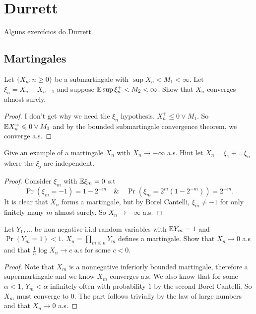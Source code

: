 \section{Durrett}
Alguns exercícios do Durrett.
\subsection{Martingales}
\begin{exercise} [4.2.4]
	Let $\{X_n : n \geq 0\}$ be a submartingale with $\sup X_n < M_1 < \infty$.
	Let $\xi_n = X_{n} - X_{n-1}$ and suppose $\mathbb{E} \sup \xi_n^+ < M_2 < \infty$.
	Show that $X_n$ converges almost surely.
\end{exercise}

\begin{proof}
	I don't get why we need the $\xi_n$ hypothesis.
	$X_n^+ \leq 0 \lor M_1$. So $\mathbb{E} X_n^+ \leqslant 0 \lor M_1$
	and by the bounded submartingale convergence theorem,
	we converge a.s.
\end{proof}

\begin{exercise}[4.2.5]
	Give an example of a martingale $X_n$ with $X_n \to -\infty$ a.s.
	Hint let $X_n = \xi_1 + \dots \xi_n$ where the $\xi_j$ are independent.
\end{exercise}
\begin{proof}
	Consider $\xi_m$ with $\mathbb{E} \xi_m = 0$ s.t
	\[
		\Pr(\xi_m = -1) = 1 - 2^{-m} \quad \& \quad \Pr(\xi_m = 2^m(1 -
		2^{-m})) = 2^{-m}.
	\]
	It is clear that $X_n$ forms a martingale, but by Borel Cantelli,
	$\xi_m \neq -1$ for only finitely many $m$ almost surely. So $X_n
	\to -\infty$ a.s.
\end{proof}

\begin{exercise}[4.2.6]
	Let $Y_1, \dots$ be non negative i.i.d random variables with $\mathbb{E}
	Y_m = 1$ and $\Pr(Y_m = 1) < 1$.
	$X_n = \prod_{m \leq n} Y_m$ defines a martingale. Show that $X_n \to 0$ a.s
	and that $\frac{1}{n}\log X_n \to c$ a.s for some $c < 0$.
\end{exercise}
\begin{proof}
	Note that $X_m$ is a nonnegative inferiorly bounded martingale, therefore
	a supermartingale and we know $X_m$ converges a.s. We also know that for some
	$\alpha < 1$, $Y_m < \alpha$ infinitely often with probability $1$ by the
	second Borel Cantelli. So $X_m$ must converge to $0$. The part follows
	trivially by the law of large numbers and that $X_n \to 0$ a.s.
\end{proof}

